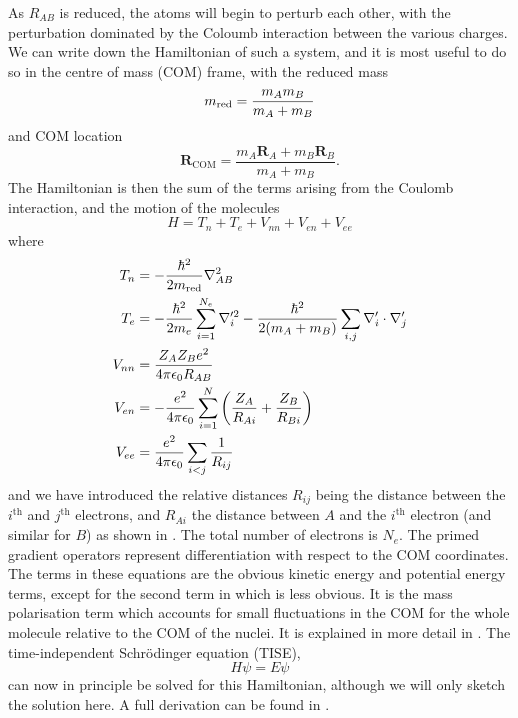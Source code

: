 As $R_{AB}$ is reduced, the atoms will begin to perturb each other, with the
perturbation dominated by the Coloumb interaction between the various charges.
We can write down the Hamiltonian of such a system, and it is most useful to do
so in the centre of mass (COM) frame, with the reduced mass
%
\begin{equation}
  m_\text{red}{} = \frac{m_A m_B}{m_A + m_B}
\end{equation}
%
and COM location
%
\begin{equation}
  \mathbf{R}_\text{COM} = \frac{m_A \mathbf{R}_A + m_B \mathbf{R}_B}{m_A+m_B}.
\end{equation}
%
The Hamiltonian is then the sum of the terms arising from the Coulomb
interaction, and the motion of the molecules
%
\begin{equation}
  H = T_n + T_e + V_{nn} + V_{en} + V_{ee}
\end{equation}
%
where
%
\begin{align}
  T_n &= -\frac{\hbar^2}{2m_\text{red}{}}\nabla_{AB}^2\\
  T_e &= -\frac{\hbar^2}{2 m_e}\sum_{i=1}^{N_e} \nabla_i'^2 -
  \frac{\hbar^2}{2(m_A + m_B)}\sum_{i, j} \nabla'_i \cdot \nabla'_j \\
  \label{theory:eqn:mpterm}
  V_{nn} &= \frac{Z_A Z_B e^2}{4\pi\epsilon_0 R_{AB}} \\
  V_{en} &= - \frac{e^2}{4\pi\epsilon_0}\sum_{i=1}^N \left(\frac{Z_A}{R_{Ai}} + \frac{Z_B}{R_{Bi}}\right) \\
  V_{ee} &= \frac{e^2}{4\pi\epsilon_0}\sum_{i<j} \frac{1}{R_{ij}}
\end{align}
%
and we have introduced the relative distances $R_{ij}$ being the distance
between the $i^\text{th}$ and $j^\text{th}$ electrons, and $R_{Ai}$ the
distance between $A$ and the $i^\text{th}$ electron (and similar for $B$) as
shown in .  The total number of electrons is $N_e$.
The primed gradient operators represent differentiation with respect to the COM
coordinates.
%
The terms in these equations are the obvious kinetic energy and potential
energy terms, except for the second term in  which
is less obvious. It is the mass polarisation term which accounts for small
fluctuations in the COM for the whole molecule relative to the COM of the
nuclei. It is explained in more detail in .
%
The time-independent Schr\"odinger equation (TISE),
%
\begin{equation}
  H\psi = E\psi
\end{equation}
%
can now in principle be solved for this Hamiltonian, although we will only
sketch the solution here. A full derivation can be found in
.

